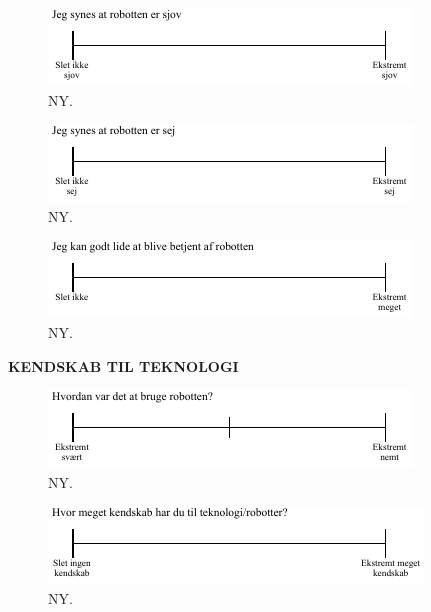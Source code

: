 \noindent
%
%
\begin{figure}[H]
\centering
\includegraphics[width =\textwidth]{Figure/UdvalgteSkalaer/SjovR} 
\caption{NY.}
\label{fig:SkalaSjovR}
\end{figure}
\noindent
%
%
\begin{figure}[H]
\centering
\includegraphics[width =\textwidth]{Figure/UdvalgteSkalaer/SejR} 
\caption{NY.}
\label{fig:SkalaSejR}
\end{figure}
\noindent
%
%
\begin{figure}[H]
\centering
\includegraphics[width =\textwidth]{Figure/UdvalgteSkalaer/BetjeningAfR} 
\caption{NY.}
\label{fig:SkalaBetjeningAfR}
\end{figure}
\noindent
%
\textbf{KENDSKAB TIL TEKNOLOGI}\\
%
\begin{figure}[H]
\centering
\includegraphics[width =\textwidth]{Figure/UdvalgteSkalaer/HvordanVarDetAtBrugeR} 
\caption{NY.}
\label{fig:SkalaHvordanVarDetAtBrugeR}
\end{figure}
\noindent
%
%
\begin{figure}[H]
\centering
\includegraphics[width =\textwidth]{Figure/UdvalgteSkalaer/KendskabTilTeknologi} 
\caption{NY.}
\label{fig:SkalaKendskabTilTeknologi}
\end{figure}
